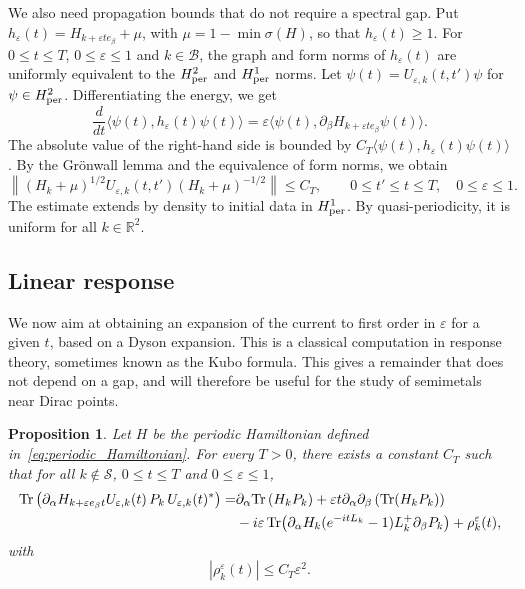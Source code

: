 \documentclass[a4paper,11pt]{article}
\theoremstyle{plain}
\newtheorem{proposition}[theorem]{Proposition}
\theoremstyle{remark}
\def\R{{\mathbb R}}
\def\eps{{\varepsilon}}
\begin{document}
We also need propagation bounds that do not require a spectral gap.
Put $h_\eps(t)=H_{k+\eps te_\beta}+\mu$, with
$\mu=1-\min\sigma(H)$, so that $h_\eps(t)\ge1$.
For $0\le t\le T$, $0\le\eps\le1$ and $k\in\mathcal B$,
the graph and form norms of $h_\eps(t)$ are uniformly equivalent to
the $H^2_{\rm per}$ and $H^1_{\rm per}$ norms.
Let $\psi(t)=U_{\eps,k}(t,t')\psi$ for $\psi\in H^2_{\rm per}$.
Differentiating the energy, we get
\[
\frac{d}{dt}\langle\psi(t),h_\eps(t)\psi(t)\rangle
=\eps\langle\psi(t),\partial_\beta H_{k+\eps te_\beta}\psi(t)\rangle.
\]
The absolute value of the right-hand side is bounded by
$C_T\langle\psi(t),h_\eps(t)\psi(t)\rangle$.
By the Gr\"onwall lemma and the equivalence of form norms, we obtain
\begin{equation}\label{eq:fixed_time_propagation}
\left\|(H_k+\mu)^{1/2}U_{\eps,k}(t,t')
(H_k+\mu)^{-1/2}\right\|\le C_T,
\qquad 0\le t'\le t\le T,\quad 0\le\eps\le1.
\end{equation}
The estimate extends by density to initial data in $H^1_{\rm per}$.
By quasi-periodicity, it is uniform for all $k\in\R^2$.

\subsection{Linear response}
\label{subsec:lr}

We now aim at obtaining an expansion of the current to first order in
$\eps$ for a given $t$, based on a Dyson expansion.
This is a classical computation in response theory, sometimes known
as the Kubo formula. This gives
a remainder that does not depend on a gap, and will therefore be
useful for the study of semimetals near Dirac points.
\begin{proposition}\label{prop:Dyson}  Let $H$ be the periodic Hamiltonian defined in~\eqref{eq:periodic_Hamiltonian}. For every $T>0$, there exists a constant $C_T$ such that for all $k\notin\mathcal S$, $0\le t\le T$ and $0\le\eps\le1$,
\begin{align}
 {\rm Tr} \left(\partial_\alpha H_{k+\eps e_\beta t}U_{\eps,k}(t)\, P_k\, U_{\eps,k}(t)^*\right) =& \partial_\alpha {\rm Tr} \left(H_k P_k\right) + \eps t  {\partial_\alpha\partial_\beta} \left( \Tr (H_k P_k) \right) \nonumber  \\ & - i \eps \Tr(\partial_\alpha H_k (e^{-i t L_k} - 1) L_{k}^{+}  \partial_\beta P_k) + \rho^\eps_k(t),
\end{align}
with
\begin{equation}\label{eq:boundrho}
|\rho^\eps_k(t)| \le C_T \eps^2.
\end{equation}
\end{proposition}
\end{document}
